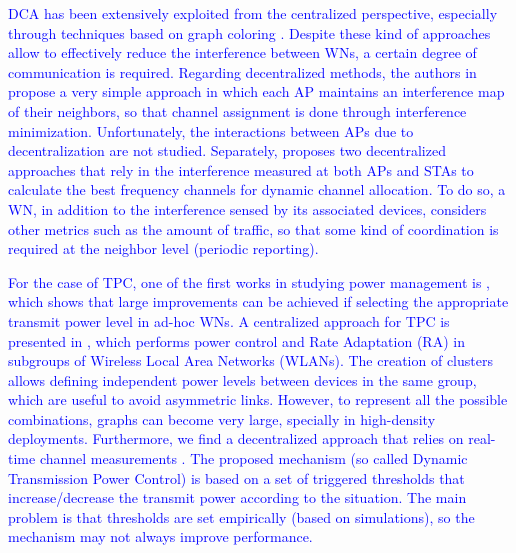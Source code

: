 \documentclass[preprint,12pt]{elsarticle}
\newcommand{\francesc}[1]{\textcolor{blue}{#1}}
\begin{document}
\francesc{DCA has been extensively exploited from the centralized perspective, especially through techniques based on graph coloring \cite{riihijarvi2005frequency, mishra2005weighted}. Despite these kind of approaches allow to effectively reduce the interference between WNs, a certain degree of communication is required. Regarding decentralized methods, the authors in \cite{akl2007dynamic} propose a very simple approach in which each AP maintains an interference map of their neighbors, so that channel assignment is done through interference minimization. Unfortunately, the interactions between APs due to decentralization are not studied. Separately, \cite{chen2007improved} proposes two decentralized approaches 
that rely in the interference measured at both APs and STAs to calculate the best frequency channels for dynamic channel allocation. To do so, a WN, in addition to the interference sensed by its associated devices, considers other metrics such as the amount of traffic, so that some kind of coordination is required at the neighbor level (periodic reporting).} %

\francesc{For the case of TPC, one of the first works in studying power management is \cite{elbatt2000power}, which shows that large improvements can be achieved if selecting the appropriate transmit power level in ad-hoc WNs. A centralized approach for TPC is presented in \cite{tang2014joint}, which performs power control and Rate Adaptation (RA) in subgroups of Wireless Local Area Networks (WLANs). The creation of clusters allows defining independent power levels between devices in the same group, which are useful to avoid asymmetric links. However, to represent all the possible combinations, graphs can become very large, specially in high-density deployments. Furthermore, we find a decentralized approach that relies on real-time channel measurements \cite{gandarillas2014dynamic}. The proposed mechanism (so called Dynamic Transmission Power Control) is based on a set of triggered thresholds that increase/decrease the transmit power according to the situation. The main problem is that thresholds are set empirically (based on simulations), so the mechanism may not always improve performance.}  	

\end{document}
